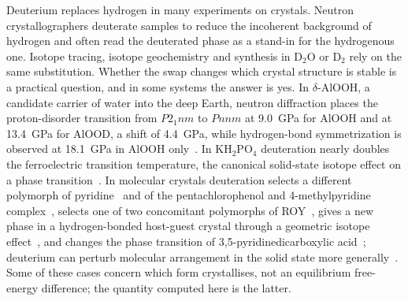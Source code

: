 \documentclass[aps,prmaterials,reprint,superscriptaddress,nofootinbib]{revtex4-2}
\begin{document}
Deuterium replaces hydrogen in many experiments on crystals. Neutron crystallographers deuterate samples to reduce the incoherent background of hydrogen and often read the deuterated phase as a stand-in for the hydrogenous one. Isotope tracing, isotope geochemistry and synthesis in D$_2$O or D$_2$ rely on the same substitution. Whether the swap changes which crystal structure is stable is a practical question, and in some systems the answer is yes. In $\delta$-AlOOH, a candidate carrier of water into the deep Earth, neutron diffraction places the proton-disorder transition from $P2_1nm$ to $Pnnm$ at 9.0~GPa for AlOOH and at 13.4~GPa for AlOOD, a shift of 4.4~GPa, while hydrogen-bond symmetrization is observed at 18.1~GPa in AlOOH only~\cite{SanoFurukawa2018,SanoFurukawa2008}. In KH$_2$PO$_4$ deuteration nearly doubles the ferroelectric transition temperature, the canonical solid-state isotope effect on a phase transition~\cite{Ubbelohde1955,Koval2002}. In molecular crystals deuteration selects a different polymorph of pyridine~\cite{Crawford2009} and of the pentachlorophenol and 4-methylpyridine complex~\cite{Zhou2004,Zhou2006,Ip2012}, selects one of two concomitant polymorphs of ROY~\cite{Falk2018}, gives a new phase in a hydrogen-bonded host-guest crystal through a geometric isotope effect~\cite{Shi2018}, and changes the phase transition of 3,5-pyridinedicarboxylic acid~\cite{Ford2011}; deuterium can perturb molecular arrangement in the solid state more generally~\cite{Merz2015}. Some of these cases concern which form crystallises, not an equilibrium free-energy difference; the quantity computed here is the latter.
\end{document}
